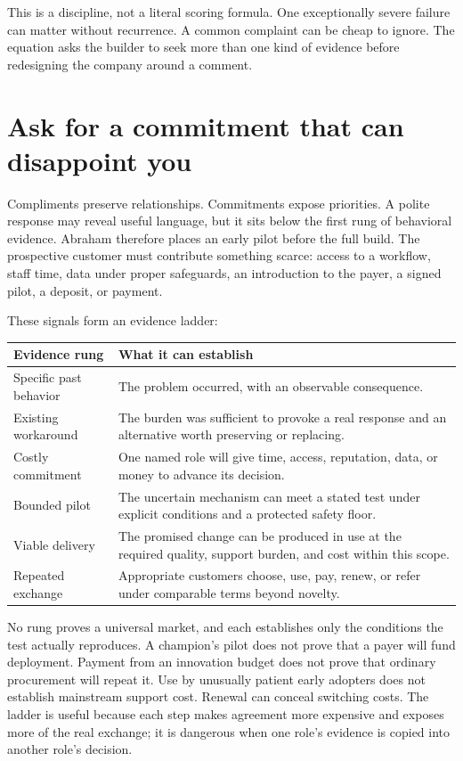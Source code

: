 This is a discipline, not a literal scoring formula. One exceptionally severe
failure can matter without recurrence. A common complaint can be cheap to
ignore. The equation asks the builder to seek more than one kind of evidence
before redesigning the company around a comment.

\section{Ask for a commitment that can disappoint you}

Compliments preserve relationships. Commitments expose priorities. A polite
response may reveal useful language, but it sits below the first rung of
behavioral evidence. Abraham therefore places an early pilot before the full
build. The prospective customer must contribute something scarce: access to a
workflow, staff time, data under proper safeguards, an introduction to the
payer, a signed pilot, a deposit, or payment.

These signals form an evidence ladder:

\begin{center}
\begin{tabular}{@{}>{\raggedright\arraybackslash}p{}%
                    >{\raggedright\arraybackslash}p{}@{}}
\toprule
\textbf{Evidence rung} & \textbf{What it can establish} \\
\midrule
Specific past behavior & The problem occurred, with an observable consequence. \\
Existing workaround & The burden was sufficient to provoke a real response and
an alternative worth preserving or replacing. \\
Costly commitment & One named role will give time, access, reputation, data, or
money to advance its decision. \\
Bounded pilot & The uncertain mechanism can meet a stated test under explicit
conditions and a protected safety floor. \\
Viable delivery & The promised change can be produced in use at the required
quality, support burden, and cost within this scope. \\
Repeated exchange & Appropriate customers choose, use, pay, renew, or refer
under comparable terms beyond novelty. \\
\bottomrule
\end{tabular}
\end{center}

No rung proves a universal market, and each establishes only the conditions the
test actually reproduces. A champion's pilot does not prove that a payer will
fund deployment. Payment from an innovation budget does not prove that ordinary
procurement will repeat it. Use by unusually patient early adopters does not
establish mainstream support cost. Renewal can conceal switching costs. The
ladder is useful because each step makes agreement more expensive and exposes
more of the real exchange; it is dangerous when one role's evidence is copied
into another role's decision.

